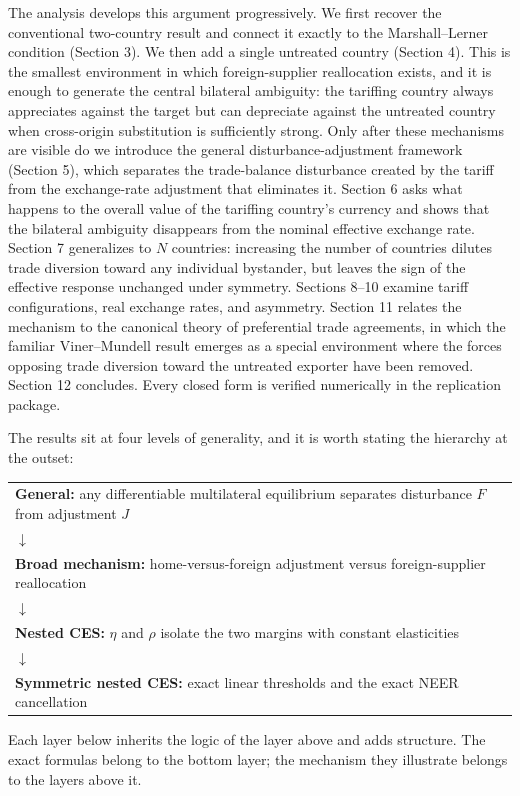 \documentclass[11pt]{article}
\begin{document}
The analysis develops this argument progressively. We first recover the conventional two-country result and connect it exactly to the Marshall--Lerner condition (Section 3). We then add a single untreated country (Section 4). This is the smallest environment in which foreign-supplier reallocation exists, and it is enough to generate the central bilateral ambiguity: the tariffing country always appreciates against the target but can depreciate against the untreated country when cross-origin substitution is sufficiently strong. Only after these mechanisms are visible do we introduce the general disturbance-adjustment framework (Section 5), which separates the trade-balance disturbance created by the tariff from the exchange-rate adjustment that eliminates it. Section 6 asks what happens to the overall value of the tariffing country's currency and shows that the bilateral ambiguity disappears from the nominal effective exchange rate. Section 7 generalizes to $N$ countries: increasing the number of countries dilutes trade diversion toward any individual bystander, but leaves the sign of the effective response unchanged under symmetry. Sections 8--10 examine tariff configurations, real exchange rates, and asymmetry. Section 11 relates the mechanism to the canonical theory of preferential trade agreements, in which the familiar Viner--Mundell result emerges as a special environment where the forces opposing trade diversion toward the untreated exporter have been removed. Section 12 concludes. Every closed form is verified numerically in the replication package.

The results sit at four levels of generality, and it is worth stating the hierarchy at the outset:
\begin{center}
\begin{tabular}{l}
\textbf{General:} any differentiable multilateral equilibrium separates disturbance $F$ from adjustment $J$ \\[2pt]
$\downarrow$ \\[2pt]
\textbf{Broad mechanism:} home-versus-foreign adjustment versus foreign-supplier reallocation \\[2pt]
$\downarrow$ \\[2pt]
\textbf{Nested CES:} $\eta$ and $\rho$ isolate the two margins with constant elasticities \\[2pt]
$\downarrow$ \\[2pt]
\textbf{Symmetric nested CES:} exact linear thresholds and the exact NEER cancellation \\
\end{tabular}
\end{center}
Each layer below inherits the logic of the layer above and adds structure. The exact formulas belong to the bottom layer; the mechanism they illustrate belongs to the layers above it.
\end{document}
